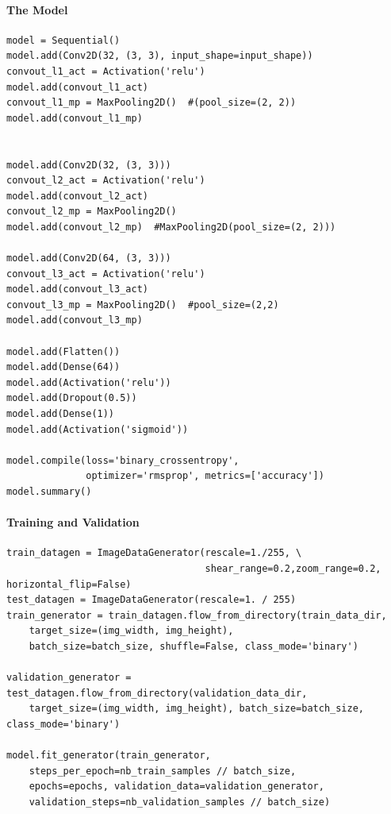 \documentclass[a4paper,11pt]{article}
\begin{document}
\paragraph{The Model}
\begin{verbatim}
model = Sequential()
model.add(Conv2D(32, (3, 3), input_shape=input_shape))
convout_l1_act = Activation('relu') 
model.add(convout_l1_act)
convout_l1_mp = MaxPooling2D()  #(pool_size=(2, 2))
model.add(convout_l1_mp)


model.add(Conv2D(32, (3, 3)))
convout_l2_act = Activation('relu')
model.add(convout_l2_act)
convout_l2_mp = MaxPooling2D()
model.add(convout_l2_mp)  #MaxPooling2D(pool_size=(2, 2)))

model.add(Conv2D(64, (3, 3)))
convout_l3_act = Activation('relu')
model.add(convout_l3_act)
convout_l3_mp = MaxPooling2D()  #pool_size=(2,2)
model.add(convout_l3_mp)

model.add(Flatten())
model.add(Dense(64))
model.add(Activation('relu'))
model.add(Dropout(0.5))
model.add(Dense(1))
model.add(Activation('sigmoid'))

model.compile(loss='binary_crossentropy',
              optimizer='rmsprop', metrics=['accuracy'])
model.summary()
\end{verbatim}

\paragraph{Training and Validation}
\begin{verbatim}
train_datagen = ImageDataGenerator(rescale=1./255, \
                                   shear_range=0.2,zoom_range=0.2, horizontal_flip=False)
test_datagen = ImageDataGenerator(rescale=1. / 255)
train_generator = train_datagen.flow_from_directory(train_data_dir,
    target_size=(img_width, img_height),
    batch_size=batch_size, shuffle=False, class_mode='binary')

validation_generator = test_datagen.flow_from_directory(validation_data_dir,
    target_size=(img_width, img_height), batch_size=batch_size, class_mode='binary')

model.fit_generator(train_generator,
    steps_per_epoch=nb_train_samples // batch_size,
    epochs=epochs, validation_data=validation_generator,
    validation_steps=nb_validation_samples // batch_size)
    
\end{verbatim}
\end{document}
